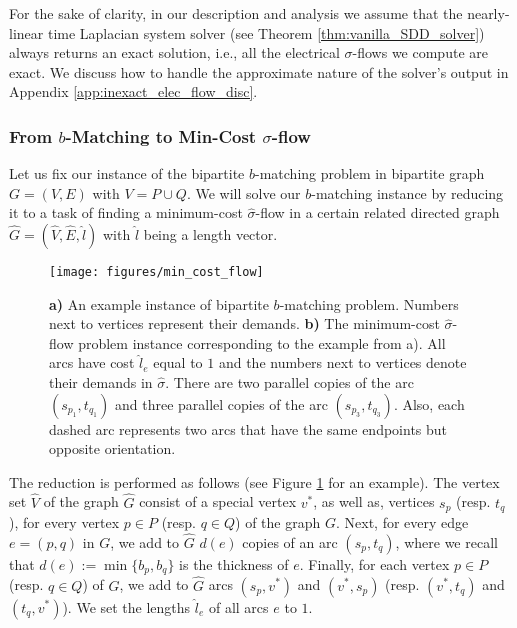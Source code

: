 \documentclass[11pt, letterpaper]{article}
\newcommand{\cG}{{G}}
\newcommand{\hG}{\widehat{G}}
\newcommand{\hV}{\widehat{V}}
\newcommand{\hE}{\widehat{E}}
\newcommand{\hl}{\hat{l}}
\newcommand{\vsigma}{\boldsymbol{\mathit{\sigma}}}
\newcommand{\hvsigma}{\boldsymbol{\mathit{\hat{\sigma}}}}
\newcommand{\bb}{\boldsymbol{\mathit{b}}}
\newcommand{\hll}{\boldsymbol{\mathit{\hat{l}}}}
\begin{document}
For the sake of clarity, in our description and analysis we assume that the nearly-linear time Laplacian system solver (see Theorem \ref{thm:vanilla_SDD_solver}) always returns an exact solution, i.e., all the electrical $\vsigma$-flows we compute are exact. We discuss how to handle the approximate nature of the solver's output in Appendix \ref{app:inexact_elec_flow_disc}. 

\subsubsection*{From \texorpdfstring{$\bb$-Matching}{b-Matching} to Min-Cost \texorpdfstring{$\vsigma$-flow}{Sigma-flow}}
Let us fix our instance of the bipartite $\bb$-matching problem in bipartite graph $G=(V,E)$ with $V=P\cup Q$. We will solve our $\bb$-matching instance by reducing it to a task of finding a minimum-cost $\hvsigma$-flow in a certain related directed graph $\hG=(\hV,\hE,\hll)$ with $\hll$ being a length vector. 

\begin{figure}[ht]
\centering
\vspace{8pt}
\texttt{[image: figures/min\_cost\_flow]}
\vspace{8pt}
\caption{{\bf a)} An example instance of bipartite $\bb$-matching problem. Numbers next to vertices represent their demands.  {\bf b)} The minimum-cost $\hvsigma$-flow problem instance corresponding to the example from a). All arcs have cost $\hl_e$ equal to $1$ and the numbers next to vertices denote their demands in $\hvsigma$. There are two parallel copies of the arc $(s_{p_1},t_{q_1})$ and three parallel copies of the arc $(s_{p_3},t_{q_3})$. Also, each dashed arc represents two arcs that have the same endpoints but opposite orientation. }
\label{fig:min_cost_example}
\end{figure}



The reduction is performed as follows (see Figure \ref{fig:min_cost_example} for an example). The vertex set $\hV$ of the graph $\hG$ consist of a special vertex $v^*$, as well as, vertices $s_p$ (resp. $t_q$), for every vertex $p\in P$ (resp. $q\in Q$) of the graph $\cG$. Next, for every edge $e=(p,q)$ in $\cG$, we add to $\hG$ $d(e)$ copies of an arc $(s_p,t_q)$, where we recall that $d(e):=\min\{b_p,b_q\}$ is the thickness of $e$. Finally, for each vertex $p\in P$ (resp. $q\in Q$) of $\cG$, we add to $\hG$ arcs $(s_p,v^*)$ and $(v^*,s_p)$ (resp. $(v^*,t_q)$ and $(t_q,v^*)$). We set the lengths $\hl_e$ of all arcs $e$ to $1$. 
\end{document}

